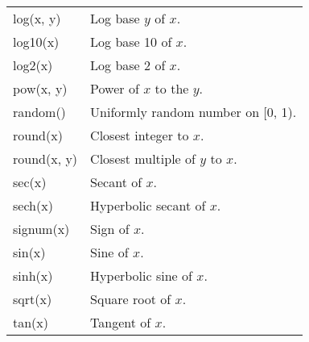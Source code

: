 \documentclass[12pt]{article}
\begin{document}
\begin{table}[ht]
\begin{tabular}{l | l}
log(x, y)                & Log base $y$ of $x$.                                                   \\
log10(x)                 & Log base 10 of $x$.                                                    \\
log2(x)                  & Log base 2 of $x$.                                                     \\
pow(x, y)                & Power of $x$ to the $y$.                                               \\
random()                 & Uniformly random number on [0, 1).                                     \\
round(x)                 & Closest integer to $x$.                                                \\
round(x, y)              & Closest multiple of $y$ to $x$.                                        \\
sec(x)                   & Secant of $x$.                                                         \\
sech(x)                  & Hyperbolic secant of $x$.                                              \\
signum(x)                & Sign of $x$.                                                           \\
sin(x)                   & Sine of $x$.                                                           \\
sinh(x)                  & Hyperbolic sine of $x$.                                                \\
sqrt(x)                  & Square root of $x$.                                                    \\
tan(x)                   & Tangent of $x$.                                                        \\
\end{tabular}
\label{table:math}
\end{table}

\printbibliography
\end{document}
